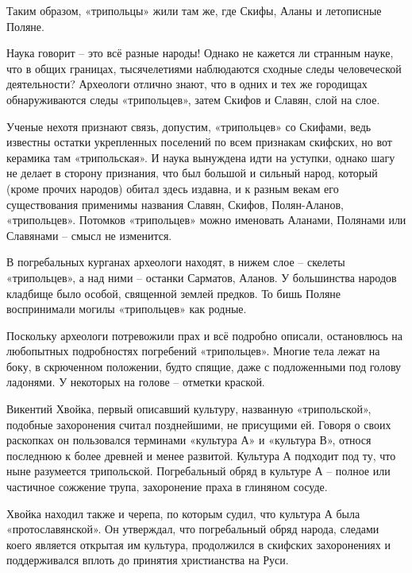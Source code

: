 Таким образом, «трипольцы» жили там же, где Скифы, Аланы и летописные Поляне.

Наука говорит – это всё разные народы! Однако не кажется ли странным науке, что в общих границах, тысячелетиями наблюдаются сходные следы человеческой деятельности? Археологи отлично знают, что в одних и тех же городищах обнаруживаются следы «трипольцев», затем Скифов и Славян, слой на слое. 

Ученые нехотя признают связь, допустим, «трипольцев» со Скифами, ведь известны остатки укрепленных поселений по всем признакам скифских, но вот керамика там «трипольская». И наука вынуждена идти на уступки, однако шагу не делает в сторону признания, что был большой и сильный народ, который (кроме прочих народов) обитал здесь издавна, и к разным векам его существования применимы названия Славян, Скифов, Полян-Аланов, «трипольцев». Потомков «трипольцев» можно именовать Аланами, Полянами или Славянами – смысл не изменится. 


В погребальных курганах археологи находят, в нижем слое – скелеты «трипольцев», а над ними – останки Сарматов, Аланов. У большинства народов кладбище было особой, священной землей предков. То бишь Поляне воспринимали могилы «трипольцев» как родные.

Поскольку археологи потревожили прах и всё подробно описали, остановлюсь на любопытных подробностях погребений «трипольцев». Многие тела лежат на боку, в скрюченном положении, будто спящие, даже с подложенными под голову ладонями. У некоторых на голове – отметки краской.

Викентий Хвойка, первый описавший культуру, названную «трипольской», подобные захоронения считал позднейшими, не присущими ей. Говоря о своих раскопках он пользовался терминами «культура А» и «культура В», относя последнюю к более древней и менее развитой. Культура А подходит под ту, что ныне разумеется трипольской. Погребальный обряд в культуре А – полное или частичное сожжение трупа, захоронение праха в глиняном сосуде.

Хвойка находил также и черепа, по которым судил, что культура А была «протославянской». Он утверждал, что погребальный обряд народа, следами коего является открытая им культура, продолжился в скифских захоронениях и поддерживался вплоть до принятия христианства на Руси.

